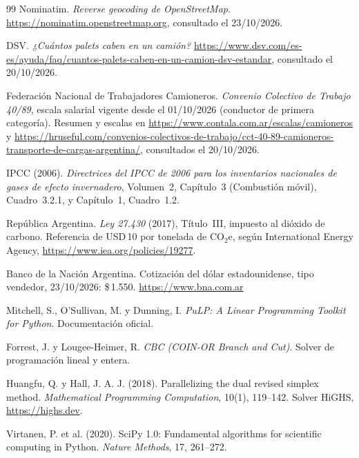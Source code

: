 \documentclass[10pt,a4paper]{article}
\begin{document}
\begin{thebibliography}{99}
 Nominatim. \emph{Reverse geocoding de OpenStreetMap}.
  \url{https://nominatim.openstreetmap.org}, consultado el 23/10/2026.

 DSV. \emph{¿Cuántos palets caben en un camión?}
  \url{https://www.dsv.com/es-es/ayuda/faq/cuantos-palets-caben-en-un-camion-dsv-estandar},
  consultado el 20/10/2026.

 Federación Nacional de Trabajadores Camioneros. \emph{Convenio
  Colectivo de Trabajo 40/89}, escala salarial vigente desde el 01/10/2026
  (conductor de primera categoría). Resumen y escalas en
  \url{https://www.contala.com.ar/escalas/camioneros} y
  \url{https://hruseful.com/convenios-colectivos-de-trabajo/cct-40-89-camioneros-transporte-de-cargas-argentina/},
  consultados el 20/10/2026.

 IPCC (2006). \emph{Directrices del IPCC de 2006 para los
  inventarios nacionales de gases de efecto invernadero}, Volumen~2, Capítulo~3
  (Combustión móvil), Cuadro~3.2.1, y Capítulo~1, Cuadro~1.2.

 República Argentina. \emph{Ley 27.430} (2017), Título~III,
  impuesto al dióxido de carbono. Referencia de USD\,10 por tonelada de
  CO$_2$e, según International Energy Agency,
  \url{https://www.iea.org/policies/19277}.

 Banco de la Nación Argentina. Cotización del dólar
  estadounidense, tipo vendedor, 23/10/2026: \$\,1.550.
  \url{https://www.bna.com.ar}

 Mitchell, S., O'Sullivan, M. y Dunning, I.
  \emph{PuLP: A Linear Programming Toolkit for Python}. Documentación oficial.

 Forrest, J. y Lougee-Heimer, R.
  \emph{CBC (COIN-OR Branch and Cut)}. Solver de programación lineal y entera.

 Huangfu, Q. y Hall, J. A. J. (2018). Parallelizing the dual
  revised simplex method. \emph{Mathematical Programming Computation}, 10(1),
  119--142. Solver HiGHS, \url{https://highs.dev}.

 Virtanen, P. et al. (2020). SciPy 1.0: Fundamental algorithms
  for scientific computing in Python. \emph{Nature Methods}, 17, 261--272.

\end{thebibliography}
\end{document}

